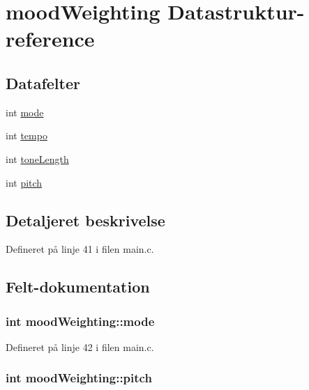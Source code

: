 \hypertarget{structmood_weighting}{\section{mood\+Weighting Datastruktur-\/reference}
\label{structmood_weighting}
}
\subsection*{Datafelter}
\begin{DoxyCompactItemize}
\item 
int \hyperlink{structmood_weighting_a61010f3a9441ad3cabbe94a31a64dad5}{mode}
\item 
int \hyperlink{structmood_weighting_a9b2180e8a4aab163ae48d0a66269a840}{tempo}
\item 
int \hyperlink{structmood_weighting_ab9e917ae02761f06d11c59645a45536d}{tone\+Length}
\item 
int \hyperlink{structmood_weighting_a27410ec4f299961816407657a3e241e8}{pitch}
\end{DoxyCompactItemize}


\subsection{Detaljeret beskrivelse}


Defineret på linje 41 i filen main.\+c.



\subsection{Felt-\/dokumentation}
\hypertarget{structmood_weighting_a61010f3a9441ad3cabbe94a31a64dad5}{
\subsubsection[{mode}]{\setlength{\rightskip}{0pt plus 5cm}int mood\+Weighting\+::mode}}\label{structmood_weighting_a61010f3a9441ad3cabbe94a31a64dad5}


Defineret på linje 42 i filen main.\+c.

\hypertarget{structmood_weighting_a27410ec4f299961816407657a3e241e8}{
\subsubsection[{pitch}]{\setlength{\rightskip}{0pt plus 5cm}int mood\+Weighting\+::pitch}}\label{structmood_weighting_a27410ec4f299961816407657a3e241e8}


